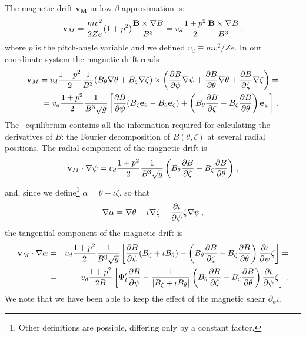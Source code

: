 The magnetic drift $\mathbf{v_M}$ in low-$\beta$ approximation is:
\begin{equation}
{\mathbf{v}}_M = \frac{mv^2}{2Ze}(1+p^2)\frac{\mathbf{B}\times\nabla B}{B^3} =  v_d \frac{1+p^2}{2}\frac{\mathbf{B}\times\nabla B}{B^3}\,,
\end{equation}
where $p$ is the pitch-angle variable and we defined $v_d\equiv mv^2/Ze$. In our coordinate system the magnetic drift reads
\begin{eqnarray}
{\mathbf{v}}_M = v_d\frac{1+p^2}{2}\frac{1}{B^3} (B_\theta\mathbf{\nabla}\theta+B_\zeta\mathbf{\nabla}\zeta)\times \left(\frac{\partial B}{\partial\psi}\mathbf{\nabla}\psi+\frac{\partial B}{\partial \theta}\mathbf{\nabla}\theta+\frac{\partial B}{\partial \zeta}\mathbf{\nabla}\zeta\right) = \nonumber\\=  v_d\frac{1+p^2}{2}\frac{1}{B^3\sqrt{g}}\left[\frac{\partial B}{\partial\psi}(B_\zeta\mathbf{e}_\theta-B_\theta\mathbf{e}_\zeta) + \left(B_\theta\frac{\partial B}{\partial \zeta}-B_\zeta\frac{\partial B}{\partial \theta}\right)\mathbf{e}_\psi\right]\,.
\end{eqnarray}
The \VMEC~equilibrium contains all the information required for calculating the derivatives of $B$: the Fourier decomposition of $B(\theta,\zeta)$ at several radial positions. The radial component of the magnetic drift is
\begin{equation}
{\mathbf{v}}_M\cdot\mathbf{\nabla}\psi= v_d\frac{1+p^2}{2}\frac{1}{B^3\sqrt{g}}\left(B_\theta\frac{\partial B}{\partial \zeta}-B_\zeta\frac{\partial B}{\partial \theta}\right)\,,
\end{equation}
and, since we define\footnote{Other definitions are possible, differing only by a constant factor.} $\alpha=\theta-\iota\zeta$, so that
\begin{equation}
\mathbf{\nabla} \alpha = \mathbf{\nabla} \theta - \iota\mathbf{\nabla}\zeta - \frac{\partial\iota}{\partial \psi}\zeta\nabla\psi\,,
\end{equation}
the tangential component of the magnetic drift is
\begin{eqnarray}
{\mathbf{v}}_M\cdot\mathbf{\nabla} \alpha &=&  v_d\frac{1+p^2}{2}\frac{1}{B^3\sqrt{g}}\left[\frac{\partial B}{\partial\psi}(B_\zeta+\iota B_\theta)-\left(B_\theta\frac{\partial B}{\partial\zeta}-B_\zeta\frac{\partial B}{\partial\theta}\right)\frac{\partial\iota}{\partial\psi}\zeta\right]=\\
&=&  v_d\frac{1+p^2}{2B}\left[\Psi_t'\frac{\partial B}{\partial\psi}-\frac{1}{|B_\zeta+\iota B_\theta|}\left(B_\theta\frac{\partial B}{\partial\zeta}-B_\zeta\frac{\partial B}{\partial\theta}\right)\frac{\partial\iota}{\partial\psi}\zeta\right]\,.
\end{eqnarray}
We note that we have been able to keep the effect of the magnetic shear $\partial_\psi\iota$.

